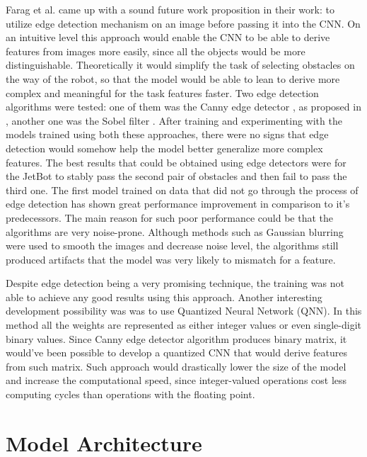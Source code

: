 Farag et al. \autocite{8855753} came up with a sound future work proposition in their work: to utilize edge detection mechanism on an image before passing it into the CNN. On an intuitive level this approach would enable the CNN to be able to derive features from images more easily, since all the objects would be more distinguishable. Theoretically it would simplify the task of selecting obstacles on the way of the robot, so that the model would be able to lean to derive more complex and meaningful for the task features faster. Two edge detection algorithms were tested: one of them was the Canny edge detector \autocite{canny1986computational}, as proposed in \autocite{8855753}, another one was the Sobel filter \autocite{sobel2014history}. After training and experimenting with the models trained using both these approaches, there were no signs that edge detection would somehow help the model better generalize more complex features. The best results that could be obtained using edge detectors were for the JetBot to stably pass the second pair of obstacles and then fail to pass the third one. The first model trained on data that did not go through the process of edge detection has shown great performance improvement in comparison to it's predecessors. The main reason for such poor performance could be that the algorithms are very noise-prone. Although methods such as Gaussian blurring were used to smooth the images and decrease noise level, the algorithms still produced artifacts that the model was very likely to mismatch for a feature.

Despite edge detection being a very promising technique, the training was not able to achieve any good results using this approach. Another interesting development possibility was was to use Quantized Neural Network (QNN). In this method all the weights are represented as either integer values or even single-digit binary values. Since Canny edge detector algorithm produces binary matrix, it would've been possible to develop a quantized CNN that would derive features from such matrix. Such approach would drastically lower the size of the model and increase the computational speed, since integer-valued operations cost less computing cycles than operations with the floating point.

\section{Model Architecture}

